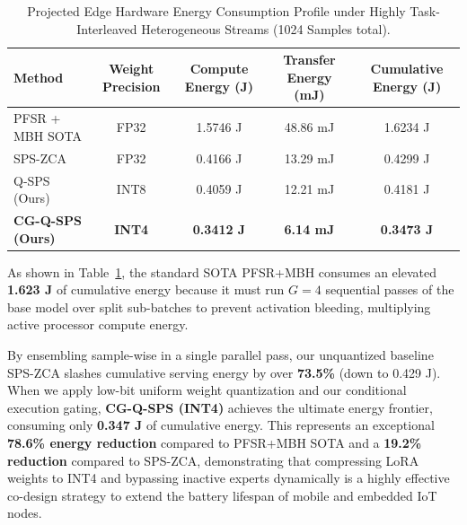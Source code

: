 \begin{table}[h]
    \caption{Projected Edge Hardware Energy Consumption Profile under Highly Task-Interleaved Heterogeneous Streams (1024 Samples total).}
    \label{tab:energy_consumption_profile}
    \vskip 0.15in
    \begin{center}
    \begin{small}
    \begin{sc}
    \begin{tabular}{lcccc}
        \toprule
        Method & Weight Precision & Compute Energy (J) & Transfer Energy (mJ) & Cumulative Energy (J) \\
        \midrule
        PFSR + MBH SOTA & FP32 & 1.5746 J & 48.86 mJ & 1.6234 J \\
        SPS-ZCA         & FP32 & 0.4166 J & 13.29 mJ & 0.4299 J \\
        Q-SPS (Ours)    & INT8 & 0.4059 J & 12.21 mJ & 0.4181 J \\
        \textbf{CG-Q-SPS (Ours)} & \textbf{INT4} & \textbf{0.3412 J} & \textbf{6.14 mJ} & \textbf{0.3473 J} \\
        \bottomrule
    \end{tabular}
    \end{sc}
    \end{small}
    \end{center}
    \vskip -0.1in
\end{table}

As shown in Table~\ref{tab:energy_consumption_profile}, the standard SOTA PFSR+MBH consumes an elevated \textbf{1.623 J} of cumulative energy because it must run $G=4$ sequential passes of the base model over split sub-batches to prevent activation bleeding, multiplying active processor compute energy.

By ensembling sample-wise in a single parallel pass, our unquantized baseline SPS-ZCA slashes cumulative serving energy by over \textbf{73.5\%} (down to 0.429 J). When we apply low-bit uniform weight quantization and our conditional execution gating, \textbf{CG-Q-SPS (INT4)} achieves the ultimate energy frontier, consuming only \textbf{0.347 J} of cumulative energy. This represents an exceptional \textbf{78.6\% energy reduction} compared to PFSR+MBH SOTA and a \textbf{19.2\% reduction} compared to SPS-ZCA, demonstrating that compressing LoRA weights to INT4 and bypassing inactive experts dynamically is a highly effective co-design strategy to extend the battery lifespan of mobile and embedded IoT nodes.
